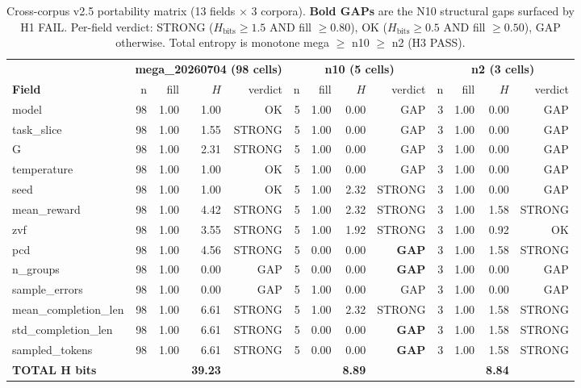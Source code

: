 \begin{table}[t]
\centering
\small
\begin{tabular}{l r r r r r r r r r r r r}
\toprule
& \multicolumn{4}{c}{\textbf{mega\_20260704 (98 cells)}} & \multicolumn{4}{c}{\textbf{n10 (5 cells)}} & \multicolumn{4}{c}{\textbf{n2 (3 cells)}} \\
\cmidrule(lr){2-5}\cmidrule(lr){6-9}\cmidrule(lr){10-13}
\textbf{Field} & n & fill & $H$ & verdict & n & fill & $H$ & verdict & n & fill & $H$ & verdict \\
\midrule
model                & 98 & 1.00 & 1.00 & OK   & 5 & 1.00 & 0.00 & GAP    & 3 & 1.00 & 0.00 & GAP \\
task\_slice           & 98 & 1.00 & 1.55 & STRONG & 5 & 1.00 & 0.00 & GAP    & 3 & 1.00 & 0.00 & GAP \\
G                    & 98 & 1.00 & 2.31 & STRONG & 5 & 1.00 & 0.00 & GAP    & 3 & 1.00 & 0.00 & GAP \\
temperature          & 98 & 1.00 & 1.00 & OK   & 5 & 1.00 & 0.00 & GAP    & 3 & 1.00 & 0.00 & GAP \\
seed                 & 98 & 1.00 & 1.00 & OK   & 5 & 1.00 & 2.32 & STRONG & 3 & 1.00 & 0.00 & GAP \\
mean\_reward          & 98 & 1.00 & 4.42 & STRONG & 5 & 1.00 & 2.32 & STRONG & 3 & 1.00 & 1.58 & STRONG \\
zvf                  & 98 & 1.00 & 3.55 & STRONG & 5 & 1.00 & 1.92 & STRONG & 3 & 1.00 & 0.92 & OK \\
pcd                  & 98 & 1.00 & 4.56 & STRONG & 5 & 0.00 & 0.00 & \textbf{GAP}    & 3 & 1.00 & 1.58 & STRONG \\
n\_groups             & 98 & 1.00 & 0.00 & GAP  & 5 & 0.00 & 0.00 & \textbf{GAP}    & 3 & 1.00 & 0.00 & GAP \\
sample\_errors        & 98 & 1.00 & 0.00 & GAP  & 5 & 1.00 & 0.00 & GAP    & 3 & 1.00 & 0.00 & GAP \\
mean\_completion\_len  & 98 & 1.00 & 6.61 & STRONG & 5 & 1.00 & 2.32 & STRONG & 3 & 1.00 & 1.58 & STRONG \\
std\_completion\_len   & 98 & 1.00 & 6.61 & STRONG & 5 & 0.00 & 0.00 & \textbf{GAP}    & 3 & 1.00 & 1.58 & STRONG \\
sampled\_tokens       & 98 & 1.00 & 6.61 & STRONG & 5 & 0.00 & 0.00 & \textbf{GAP}    & 3 & 1.00 & 1.58 & STRONG \\
\midrule
\textbf{TOTAL H bits} & & & \textbf{39.23} & & & & \textbf{8.89} & & & & \textbf{8.84} & \\
\bottomrule
\end{tabular}
\caption{Cross-corpus v2.5 portability matrix (13 fields $\times$ 3 corpora).
\textbf{Bold GAPs} are the N10 structural gaps surfaced by H1 FAIL.
Per-field verdict: STRONG ($H_{\text{bits}} \geq 1.5$ AND fill $\geq 0.80$),
OK ($H_{\text{bits}} \geq 0.5$ AND fill $\geq 0.50$), GAP otherwise.
Total entropy is monotone mega $\geq$ n10 $\geq$ n2 (H3 PASS).}
\label{tab:p5-iter185-v25-cross-corpus}
\end{table}